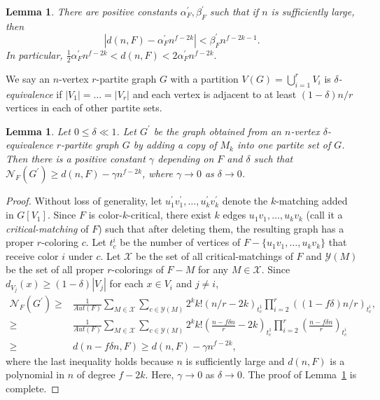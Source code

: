 \documentclass[10pt]{article}
\newtheorem{lemma}[theorem]{Lemma}
\begin{document}
\begin{lemma}\label{counting F in Tp(n) with adding a matching}
 There are positive constants $\alpha^\prime_F,\beta^\prime_F$ such that if $n$ is sufficiently large, then
$$|d(n,F)-\alpha^\prime_F n^{f-2k}|<\beta^\prime_F n ^{f-2k-1}.$$
In particular, $\frac{1}{2}\alpha^\prime_F n^{f-2k} <d(n,F)<2\alpha^\prime_F n^{f-2k}.$
\end{lemma}

We say an $n$-vertex $r$-partite graph $G$ with a partition $V(G)=\bigcup_{i=1}^{r}V_i$ is {\it $\delta$-equivalence}
 if $|V_1|=\ldots=|V_r|$ and each vertex is adjacent to at least $(1-\delta)n/r$ vertices in each of other partite sets.

\begin{lemma}\label{couting F in near complete graph within a mathing}
Let $0\leq\delta\ll1$. Let $G^\prime$ be the graph obtained from an $n$-vertex $\delta$-equivalence $r$-partite graph $G$ by adding a copy of $M_k$ into one partite set of $G$.
Then there is a positive constant $\gamma$ depending on $F$ and $\delta$ such that
$\mathcal{N}_F(G^\prime)\geq d(n,F)-\gamma n^{f-2k}$, where $\gamma\to 0$ as $\delta\to 0$.
\end{lemma}
\begin{proof}
Without loss of generality, let $u^\prime_1v^\prime_1,\ldots,u^\prime_kv^\prime_k$ denote the $k$-matching added in $G[V_1]$.
Since $F$ is color-$k$-critical, there exist $k$ edges $u_1v_1,\ldots,u_kv_k$ (call it a {\it critical-matching} of $F$) such that after deleting them, the resulting graph has a proper $r$-coloring $c$.
Let $t_c^i$ be the number of vertices of $F-\{u_1v_1,\ldots,u_kv_k\}$ that receive color $i$ under $c$.
Let $\mathcal{X}$ be the set of all critical-matchings of $F$ and $\mathcal{Y}(M)$ be the set of all proper $r$-colorings of $F-M$ for any $M\in \mathcal{X}$.
Since $d_{V_{j}}(x)\geq (1-\delta)|V_j|$ for each $x\in V_i$ and $j\neq i$,
\begin{align*}
\mathcal{N}_F(G^\prime)\geq &\frac{1}{Aut(F)}\sum_{M\in \mathcal{X}}\sum_{c\in \mathcal{Y}(M)}2^kk!(n/r-2k)_{t_c^1}\prod^r_{i=2}((1-f\delta)n/r)_{t_c^i},\\
\geq&\frac{1}{Aut(F)}\sum_{M\in \mathcal{X}}\sum_{c\in \mathcal{Y}(M)}2^kk!\left(\frac{n-f\delta n}{r}-2k\right)_{t_c^1}\prod^r_{i=2}\left(\frac{n-f\delta n}{r}\right)_{t_c^i}\\
\geq &d(n-f\delta n,F)\geq d(n,F)-\gamma n^{f-2k},
\end{align*}
where the last inequality holds because $n$ is sufficiently large and $d(n,F)$ is a polynomial in $n$ of degree $f-2k$.
Here, $\gamma\to 0$ as $\delta\to 0$. The proof of Lemma~\ref{couting F in near complete graph within a mathing} is complete.
\end{proof}
\end{document}
